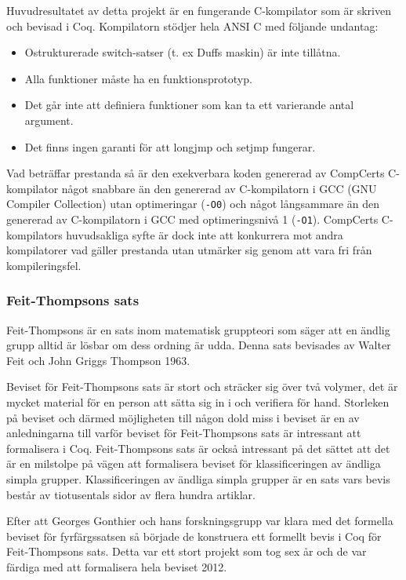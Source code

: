 Huvudresultatet av detta projekt är en fungerande C-kompilator som är skriven
och bevisad i Coq. Kompilatorn stödjer hela ANSI C med följande undantag:
\begin{itemize}
  \item Ostrukturerade switch-satser (t. ex Duffs maskin) är inte tillåtna.
  \item Alla funktioner måste ha en funktionsprototyp.
  \item Det går inte att definiera funktioner som kan ta ett
    varierande antal argument.
  \item Det finns ingen garanti för att longjmp och setjmp fungerar.
\end{itemize}
Vad beträffar prestanda så är den exekverbara koden genererad av
CompCerts C-kompilator något snabbare än den genererad av
C-kompilatorn i GCC (GNU Compiler Collection) utan optimeringar
(\texttt{-O0}) och något långsammare än den genererad av
C-kompilatorn i GCC med optimeringsnivå 1 (\texttt{-O1}). CompCerts
C-kompilators huvudsakliga syfte är dock inte att konkurrera mot
andra kompilatorer vad gäller prestanda utan utmärker sig genom
att vara fri från kompileringsfel.

\subsubsection{Feit-Thompsons sats}
Feit-Thompsons är en sats inom matematisk gruppteori som säger att en ändlig
grupp alltid är lösbar om dess ordning är udda. Denna sats bevisades av Walter
Feit och John Griggs Thompson 1963.

Beviset för Feit-Thompsons sats är stort och sträcker sig över två volymer, det
är mycket material för en person att sätta sig in i och verifiera för hand.
Storleken på beviset och därmed möjligheten till någon dold miss i beviset är
en av anledningarna till varför beviset för Feit-Thompsons sats är intressant
att formalisera i Coq. Feit-Thompsons sats är också intressant på det sättet
att det är en milstolpe på vägen att formalisera beviset för klassificeringen
av ändliga simpla grupper. Klassificeringen av ändliga simpla grupper är en
sats vars bevis består av tiotusentals sidor av flera hundra artiklar.

Efter att Georges Gonthier och hans forskningsgrupp var klara med det formella
beviset för fyrfärgssatsen så började de konstruera ett formellt bevis i Coq
för Feit-Thompsons sats. Detta var ett stort projekt som tog sex år och de var
färdiga med att formalisera hela beviset 2012.

